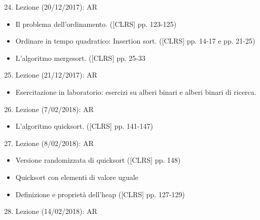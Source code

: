 \documentclass{article}
\providecommand{\tightlist}{%
  \setlength{\itemsep}{0pt}\setlength{\parskip}{0pt}}
\begin{document}
\begin{enumerate}
\setcounter{enumi}{23}
\tightlist
\item
  {Lezione (20/12/2017): AR}
\end{enumerate}

\begin{itemize}
\tightlist
\item
  {Il problema dell'ordinamento. ({[}CLRS{]} pp. 123-125)}
\item
  {Ordinare in tempo quadratico: Insertion sort. ({[}CLRS{]} pp. 14-17 e
  pp. 21-25)}
\item
  {L'algoritmo mergesort. ({[}CLRS{]} pp. 25-33}
\end{itemize}

\begin{enumerate}
\setcounter{enumi}{24}
\tightlist
\item
  {Lezione (21/12/2017): AR}
\end{enumerate}

\begin{itemize}
\tightlist
\item
  {Esercitazione in laboratorio: esercizi su alberi binari e alberi
  binari di ricerca.}
\end{itemize}

\begin{enumerate}
\setcounter{enumi}{25}
\tightlist
\item
  {Lezione (7/02/2018): AR}
\end{enumerate}

\begin{itemize}
\tightlist
\item
  {L'algoritmo quicksort. ({[}CLRS{]} pp. 141-147)}
\end{itemize}

\begin{enumerate}
\setcounter{enumi}{26}
\tightlist
\item
  {Lezione (8/02/2018): AR}
\end{enumerate}

\begin{itemize}
\tightlist
\item
  {Versione randomizzata di quicksort ({[}CLRS{]} pp. 148)}
\item
  {Quicksort con elementi di valore uguale}
\item
  {Definizione e proprietà dell'heap ({[}CLRS{]} pp. 127-129)}
\end{itemize}

\begin{enumerate}
\setcounter{enumi}{27}
\tightlist
\item
  {Lezione (14/02/2018): AR}
\end{enumerate}
\end{document}
